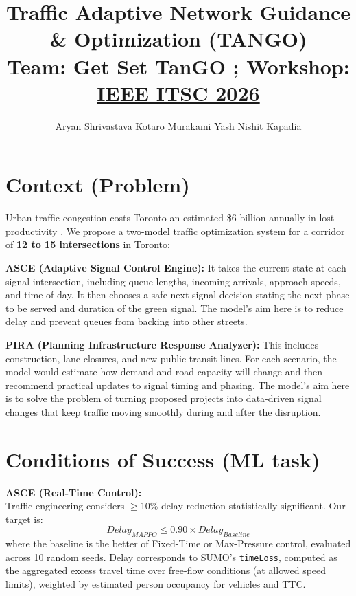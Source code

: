 \documentclass[10pt,twocolumn]{article}
\begin{document}
\title{\vspace{-2.5em}\Large \textbf{Traffic Adaptive Network Guidance \& Optimization (TANGO)}\\
\vspace{0.3em}
\small \textnormal{Team: Get Set TanGO ; Workshop: \href{https://ieee-itsc.org/2026/}{IEEE ITSC 2026}}}

\author{
    \small Aryan Shrivastava \quad Kotaro Murakami \quad Yash Nishit Kapadia
}
\date{\vspace{-2em}} %

\maketitle

\section{Context (Problem)}
Urban traffic congestion costs Toronto an estimated \$6 billion annually in lost productivity \cite{cbc_gridlock}. We propose a two-model traffic optimization system for a corridor of \textbf{12 to 15 intersections} in Toronto:

\textbf{ASCE (Adaptive Signal Control Engine):} It takes the current state at each signal intersection, including queue lengths, incoming arrivals, approach speeds, and time of day. It then chooses a safe next signal decision stating the next phase to be served and duration of the green signal. The model's aim here is to reduce delay and prevent queues from backing into other streets.

\textbf{PIRA (Planning Infrastructure Response Analyzer):} This includes construction, lane closures, and new public transit lines. For each scenario, the model would estimate how demand and road capacity will change and then recommend practical updates to signal timing and phasing. The model's aim here is to solve the problem of turning proposed projects into data-driven signal changes that keep traffic moving smoothly during and after the disruption.

\section{Conditions of Success (ML task)}
\textbf{ASCE (Real-Time Control):}\\
Traffic engineering considers $\geq$10\% delay reduction statistically significant. Our target is:
\begin{equation*}
    Delay_{MAPPO} \leq 0.90 \times Delay_{Baseline}
\end{equation*}
where the baseline is the better of Fixed-Time or Max-Pressure control, evaluated across 10 random seeds.
Delay corresponds to SUMO's \texttt{timeLoss}, computed as the aggregated excess travel time over free-flow conditions (at allowed speed limits), weighted by estimated person occupancy for vehicles and TTC.
\end{document}
